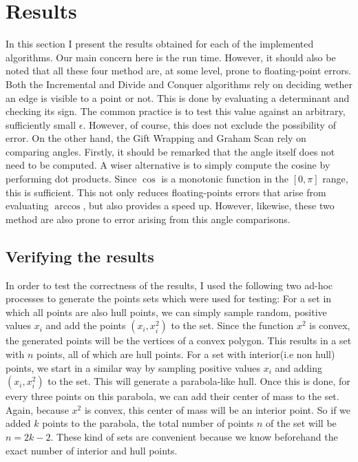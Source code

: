 \documentclass[a4paper, 10pt, conference]{ieeeconf}      %
\begin{document}
\section{Results}
In this section I present the results obtained for each of the implemented algorithms.
Our main concern here is the run time.
However, it should also be noted that all these four method are, at some level, prone to floating-point errors.
Both the Incremental and Divide and Conquer algorithms rely on deciding wether an edge is visible to a point or not.
This is done by evaluating a determinant and checking its sign.
The common practice is to test this value against an arbitrary, sufficiently small $\epsilon$.
However, of course, this does not exclude the possibility of error.
On the other hand, the Gift Wrapping and Graham Scan rely on comparing angles.
Firstly, it should be remarked that the angle itself does not need to be computed.
A wiser alternative is to simply compute the cosine by performing dot products.
Since $\cos$ is a monotonic function in the $[0, \pi]$ range, this is sufficient.
This not only reduces floating-points errors that arise from evaluating $\arccos$, but also provides a speed up.
However, likewise, these two method are also prone to error arising from this angle comparisons.

\subsection{Verifying the results}
In order to test the correctness of the results, I used the following two ad-hoc processes to generate the points sets which were used for testing:
For a set in which all points are also hull points, we can simply sample random, positive values $x_i$ and add the points $(x_i, x_{i}^{2})$ to the set.
Since the function $x^2$ is convex, the generated points will be the vertices of a convex polygon.
This results in a set with $n$ points, all of which are hull points.
For a set with interior(i.e non hull) points, we start in a similar way by sampling positive values $x_i$ and adding $(x_i, x_{i}^{2})$ to the set.
This will generate a parabola-like hull.
Once this is done, for every three points on this parabola, we can add their center of mass to the set.
Again, because $x^2$ is convex, this center of mass will be an interior point.
So if we added $k$ points to the parabola, the total number of points $n$ of the set will be $n = 2k - 2$.
These kind of sets are convenient because we know beforehand the exact number of interior and hull points.
\end{document}
